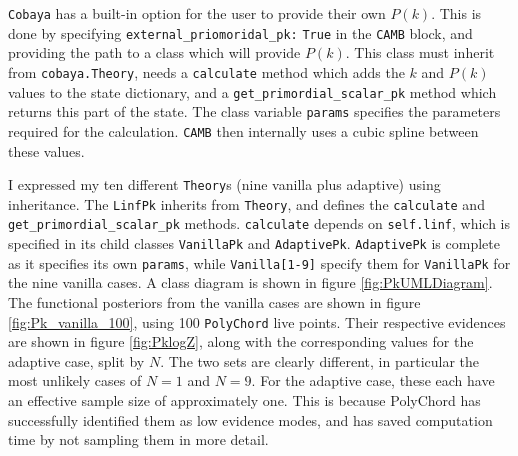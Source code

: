 \documentclass{article}
\begin{document}
\texttt{Cobaya} has a built-in option for the user to provide their own $P(k)$. This is done by specifying \texttt{external\_priomoridal\_pk:} \texttt{True} in the \texttt{CAMB} block, and providing the path to a class which will provide $P(k)$. This class must inherit from \texttt{cobaya.Theory}, needs a \texttt{calculate} method which adds the $k$ and $P(k)$ values to the state dictionary, and a \texttt{get\_primordial\_scalar\_pk} method which returns this part of the state. The class variable \texttt{params} specifies the parameters required for the calculation. \texttt{CAMB} then internally uses a cubic spline between these values.

I expressed my ten different \texttt{Theory}s (nine vanilla plus adaptive) using inheritance. The \texttt{LinfPk} inherits from \texttt{Theory}, and defines the \texttt{calculate} and \texttt{get\_primordial\_scalar\_pk} methods. \texttt{calculate} depends on \texttt{self.linf}, which is specified in its child classes \texttt{VanillaPk} and \texttt{AdaptivePk}. \texttt{AdaptivePk} is complete as it specifies its own \texttt{params}, while \texttt{Vanilla[1-9]} specify them for  \texttt{VanillaPk} for the nine vanilla cases. A class diagram is shown in figure \ref{fig:PkUMLDiagram}. The functional posteriors from the vanilla cases are shown in figure \ref{fig:Pk_vanilla_100}, using 100 \texttt{PolyChord} live points. Their respective evidences are shown in figure \ref{fig:PklogZ}, along with the corresponding values for the adaptive case, split by $N$. The two sets are clearly different, in particular the most unlikely cases of $N=1$ and $N=9$. For the adaptive case, these each have an effective sample size of approximately one. This is because PolyChord has successfully identified them as low evidence modes, and has saved computation time by not sampling them in more detail.
\end{document}
